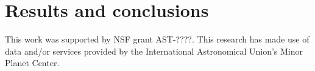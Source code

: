 \documentclass[linenumbers, onecolumn]{aastex631}
\begin{document}
\section{Results and conclusions}
\label{sec:results}

\begin{acknowledgments}
  This work was supported by NSF grant AST-????.
  This research has made use of data and/or services provided by the International Astronomical Union's Minor Planet Center. 
\end{acknowledgments}

\newpage

%
\end{document}
